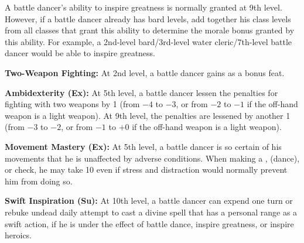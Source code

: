 {A battle dancer's ability to inspire greatness is normally granted at 9th level. However, if a battle dancer already has bard levels, add together his class levels from all classes that grant this ability to determine the morale bonus granted by this ability. For example, a 2nd-level bard/3rd-level water cleric/7th-level battle dancer would be able to inspire greatness.

\textbf{Two-Weapon Fighting:} At 2nd level, a battle dancer gains  as a bonus feat.

\textbf{Ambidexterity (Ex):} At 5th level, a battle dancer lessen the penalties for fighting with two weapons by 1 (from $-4$ to $-3$, or from $-2$ to $-1$ if the off-hand weapon is a light weapon). At 9th level, the penalties are lessened by another 1 (from $-3$ to $-2$, or from $-1$ to $+0$ if the off-hand weapon is a light weapon).

\textbf{Movement Mastery (Ex):} At 5th level, a battle dancer is so certain of his movements that he is unaffected by adverse conditions. When making a ,  (dance), or  check, he may take 10 even if stress and distraction would normally prevent him from doing so.

\textbf{Swift Inspiration (Su):} At 10th level, a battle dancer can expend one turn or rebuke undead daily attempt to cast a divine spell that has a personal range as a swift action, if he is under the effect of battle dance, inspire greatness, or inspire heroics.
}